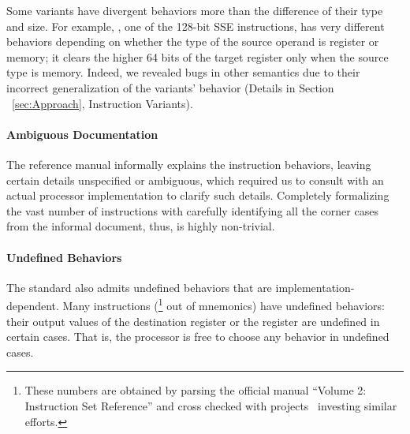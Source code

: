 Some variants have divergent behaviors more than the difference of their type and size. For example, , one of the 128-bit SSE instructions, has very different behaviors depending on whether the type of the source operand is register or memory; it clears the higher 64 bits of the target register only when the source type is memory.
Indeed, we revealed bugs in other semantics due to their incorrect generalization of the variants' behavior (Details in Section ~\ref{sec:Approach}, Instruction Variants).

\vspace{-2pt}
\paragraph{Ambiguous Documentation}

The \ISA reference manual informally explains the instruction behaviors, leaving certain details unspecified or ambiguous, which required us to consult with an actual processor implementation to clarify such details.
%
Completely formalizing the vast number of instructions with carefully identifying all the corner cases from the informal document, thus, is highly non-trivial.

\vspace{-2pt}
\paragraph{Undefined Behaviors}

The \ISA standard also admits undefined behaviors that are implementation-dependent.
Many instructions (\undefIntel{}\footnote{\label{note1}These numbers are obtained by parsing the official manual ``Volume 2: Instruction Set Reference'' and cross checked with projects~\cite{Stoke2013, Felix} investing similar efforts.} out of \totalIntel{} mnemonics) have undefined behaviors: their output values of the destination register or the  register are undefined in certain cases.
That is, the processor is free to choose any behavior in undefined cases.
%

